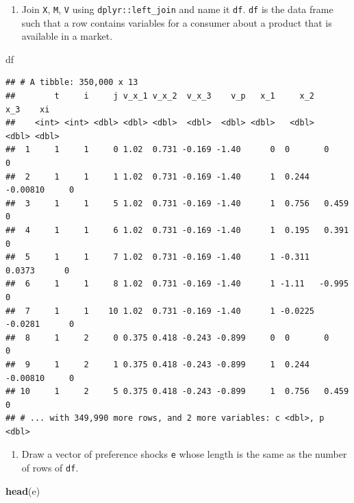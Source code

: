 \documentclass[]{book}
\newenvironment{Shaded}{\begin{snugshade}}{\end{snugshade}}
\newcommand{\KeywordTok}[1]{\textcolor[rgb]{0.13,0.29,0.53}{\textbf{#1}}}
\newcommand{\NormalTok}[1]{#1}
\providecommand{\tightlist}{%
  \setlength{\itemsep}{0pt}\setlength{\parskip}{0pt}}
\begin{document}
\begin{enumerate}
\def\labelenumi{\arabic{enumi}.}
\setcounter{enumi}{4}
\tightlist
\item
  Join \texttt{X}, \texttt{M}, \texttt{V} using
  \texttt{dplyr::left\_join} and name it \texttt{df}. \texttt{df} is the
  data frame such that a row contains variables for a consumer about a
  product that is available in a market.
\end{enumerate}

\begin{Shaded}
\begin{Highlighting}[]
\NormalTok{df}
\end{Highlighting}
\end{Shaded}

\begin{verbatim}
## # A tibble: 350,000 x 13
##        t     i     j v_x_1 v_x_2  v_x_3    v_p   x_1     x_2      x_3    xi
##    <int> <int> <dbl> <dbl> <dbl>  <dbl>  <dbl> <dbl>   <dbl>    <dbl> <dbl>
##  1     1     1     0 1.02  0.731 -0.169 -1.40      0  0       0           0
##  2     1     1     1 1.02  0.731 -0.169 -1.40      1  0.244  -0.00810     0
##  3     1     1     5 1.02  0.731 -0.169 -1.40      1  0.756   0.459       0
##  4     1     1     6 1.02  0.731 -0.169 -1.40      1  0.195   0.391       0
##  5     1     1     7 1.02  0.731 -0.169 -1.40      1 -0.311   0.0373      0
##  6     1     1     8 1.02  0.731 -0.169 -1.40      1 -1.11   -0.995       0
##  7     1     1    10 1.02  0.731 -0.169 -1.40      1 -0.0225 -0.0281      0
##  8     1     2     0 0.375 0.418 -0.243 -0.899     0  0       0           0
##  9     1     2     1 0.375 0.418 -0.243 -0.899     1  0.244  -0.00810     0
## 10     1     2     5 0.375 0.418 -0.243 -0.899     1  0.756   0.459       0
## # ... with 349,990 more rows, and 2 more variables: c <dbl>, p <dbl>
\end{verbatim}

\begin{enumerate}
\def\labelenumi{\arabic{enumi}.}
\setcounter{enumi}{5}
\tightlist
\item
  Draw a vector of preference shocks \texttt{e} whose length is the same
  as the number of rows of \texttt{df}.
\end{enumerate}

\begin{Shaded}
\begin{Highlighting}[]
\KeywordTok{head}\NormalTok{(e)}
\end{Highlighting}
\end{Shaded}
\end{document}
